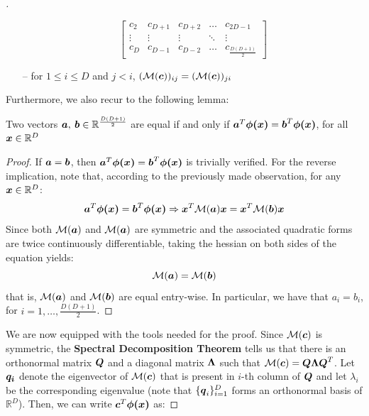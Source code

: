 \begin{questions}
\begin{proof}[\unskip\nopunct]
\begin{itemize}
\[\begin{bmatrix}
                    c_2 & c_{D + 1} & c_{D + 2} & \dots & c_{2D - 1} \\
                    \vdots & \vdots & \vdots & \ddots & \vdots \\
                    c_D & c_{D - 1} & c_{D - 2} & \dots & c_{\frac{D(D + 1)}{2}} 
                \end{bmatrix}
            \]
            \item[--] for $1 \le i \le D$ and $j < i$, $(\mathcal{M}(\vb*{c}))_{ij} = (\mathcal{M}(\vb*{c}))_{ji}$
        \end{itemize}
        Furthermore, we also recur to the following lemma:

        \begin{lemma}
            Two vectors $\vb*{a}, \: \vb*{b} \in \mathbb{R}^{\frac{D(D + 1)}{2}}$ are equal if and only if $\vb*{a}^T \vb*{\phi(x)} = \vb*{b}^T \vb*{\phi(x)}$, for all $\vb*{x} \in \mathbb{R}^D$
        \end{lemma}
        \begin{proof}
            If $\vb*{a} = \vb*{b}$, then $\vb*{a}^T \vb*{\phi(x)} = \vb*{b}^T \vb*{\phi(x)}$ is trivially verified. For the reverse implication, note that, according to the previously made observation, for any $\vb*{x} \in \mathbb{R}^D$:
            \[
                \vb*{a}^T \vb*{\phi(x)} = \vb*{b}^T \vb*{\phi(x)} \Rightarrow \vb*{x}^T \mathcal{M}(\vb*{a}) \vb*{x} = \vb*{x}^T \mathcal{M}(\vb*{b}) \vb*{x}
            \]
            Since both $\mathcal{M}(\vb*{a})$ and $\mathcal{M}(\vb*{a})$ are symmetric and the associated quadratic forms are twice continuously differentiable, taking the hessian on both sides of the equation yields:
            \[
                \mathcal{M}(\vb*{a}) = \mathcal{M}(\vb*{b})
            \]
            that is, $\mathcal{M}(\vb*{a})$ and $\mathcal{M}(\vb*{b})$ are equal entry-wise. In particular, we have that $a_i = b_i$, for $i = 1, \dots, \frac{D(D + 1)}{2}$.
        \end{proof}
        We are now equipped with the tools needed for the proof. Since $\mathcal{M}(\vb*{c})$ is symmetric, the \textbf{Spectral Decomposition Theorem} tells us that there is an orthonormal matrix $\vb*{Q}$ and a diagonal matrix $\vb*{\Lambda}$ such that $\mathcal{M}(\vb*{c}) = \vb*{Q} \vb*{\Lambda}\vb*{Q}^T$. Let $\vb*{q_i}$ denote the eigenvector of $\mathcal{M}(\vb*{c})$ that is present in $i$-th column of $\vb*{Q}$ and let $\lambda_i$ be the corresponding eigenvalue (note that $\{\vb*{q}_i\}_{i = 1}^{D}$ forms an orthonormal basis of $\mathbb{R}^{D}$). Then, we can write $\vb*{c}^T \vb*{\phi(x)}$ as:

\end{proof}
\end{questions}
